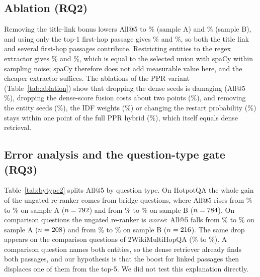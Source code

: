 \documentclass[a4paper,fleqn]{cas-sc}
\begin{document}

\subsection{Ablation (RQ2)}
Removing the title-link bonus lowers All@5 to \RSampleAAblTwoNoTitleAllSupp\% (sample A) and \RSampleBAblTwoNoTitleAllSupp\% (sample B), and using only the top-1 first-hop passage gives \RSampleAAblTwoOneSeedAllSupp\% and \RSampleBAblTwoOneSeedAllSupp\%, so both the title link and several first-hop passages contribute. Restricting entities to the regex extractor gives \RSampleAAblTwoRegexNerAllSupp\% and \RSampleBAblTwoRegexNerAllSupp\%, which is equal to the selected union with spaCy within sampling noise; spaCy therefore does not add measurable value here, and the cheaper extractor suffices. The ablations of the PPR variant (Table~\ref{tab:ablation}) show that dropping the dense seeds is damaging (All@5 \RHotpotQAAblNoDenseSeedAllSupp\%), dropping the dense-score fusion costs about two points (\RHotpotQAAblNoFusionAllSupp\%), and removing the entity seeds (\RHotpotQAAblNoEntitySeedAllSupp\%), the IDF weights (\RHotpotQAAblNoIdfAllSupp\%) or changing the restart probability (\RHotpotQAAblAlphaZeroAllSupp\%) stays within one point of the full PPR hybrid (\RHotpotQAHybridAllSupp\%), which itself equals dense retrieval.


\subsection{Error analysis and the question-type gate (RQ3)}\label{sec:bytype}

Table~\ref{tab:bytype2} splits All@5 by question type. On HotpotQA the whole gain of the ungated re-ranker comes from bridge questions, where All@5 rises from \TypHADensebridge\% to \TypHATwobridge\% on sample A ($n=792$) and from \TypHBDensebridge\% to \TypHBTwobridge\% on sample B ($n=784$). On comparison questions the ungated re-ranker is \emph{worse}: All@5 falls from \TypHADensecomparison\% to \TypHATwocomparison\% on sample A ($n=208$) and from \TypHBDensecomparison\% to \TypHBTwocomparison\% on sample B ($n=216$). The same drop appears on the comparison questions of 2WikiMultiHopQA (\TypTWDensecomparison\% to \TypTWTwocomparison\%). A comparison question names both entities, so the dense retriever already finds both passages, and our hypothesis is that the boost for linked passages then displaces one of them from the top-5. We did not test this explanation directly.
\end{document}
